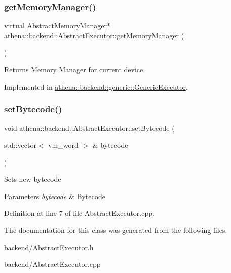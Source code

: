 \subsubsection{\texorpdfstring{get\+Memory\+Manager()}{getMemoryManager()}}
{\footnotesize\ttfamily virtual \mbox{\hyperlink{classathena_1_1backend_1_1_abstract_memory_manager}{Abstract\+Memory\+Manager}}$\ast$ athena\+::backend\+::\+Abstract\+Executor\+::get\+Memory\+Manager (\begin{DoxyParamCaption}{ }\end{DoxyParamCaption})\hspace{0.3cm}{\ttfamily [pure virtual]}}

\begin{DoxyReturn}{Returns}
Memory Manager for current device 
\end{DoxyReturn}


Implemented in \mbox{\hyperlink{classathena_1_1backend_1_1generic_1_1_generic_executor_a0560a1dfc0c70ebef0b5be26bb82b9c5}{athena\+::backend\+::generic\+::\+Generic\+Executor}}.

\mbox{\label{classathena_1_1backend_1_1_abstract_executor_afa06d9875ee6c53986873f29db380893}} 
\subsubsection{\texorpdfstring{set\+Bytecode()}{setBytecode()}}
{\footnotesize\ttfamily void athena\+::backend\+::\+Abstract\+Executor\+::set\+Bytecode (\begin{DoxyParamCaption}\item[{std\+::vector$<$ vm\+\_\+word $>$ \&}]{bytecode }\end{DoxyParamCaption})}

Sets new bytecode 
\begin{DoxyParams}{Parameters}
{\em bytecode} & Bytecode \\
\hline
\end{DoxyParams}


Definition at line 7 of file Abstract\+Executor.\+cpp.



The documentation for this class was generated from the following files\+:\begin{DoxyCompactItemize}
\item 
backend/Abstract\+Executor.\+h\item 
backend/Abstract\+Executor.\+cpp\end{DoxyCompactItemize}
